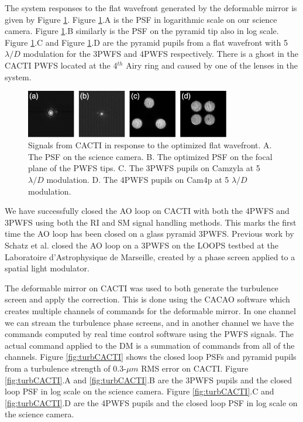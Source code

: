  The system responses to the flat wavefront generated by the deformable mirror is given by Figure \ref{fig:flatCACTI}. Figure \ref{fig:flatCACTI}.A is the PSF in logarithmic scale on our science camera. Figure \ref{fig:flatCACTI}.B similarly is the PSF on the pyramid tip also in log scale. Figure  \ref{fig:flatCACTI}.C and Figure \ref{fig:flatCACTI}.D are the pyramid pupils from a flat wavefront with 5$\lambda/D$ modulation for the 3PWFS and 4PWFS respectively. There is a ghost in the CACTI PWFS located at the 4$^{th}$ Airy ring and caused by one of the lenses in the system. 

\begin{figure}
    \centering
    \includegraphics[width=0.8\textwidth]{Chapter Materials/Chapter Five Materials/flatCACTI.png}
    \caption{Signals from CACTI in response to the optimized flat wavefront. A. The PSF on the science camera. B. The optimized PSF on the focal plane of the PWFS tips. C. The 3PWFS pupils on Camzyla at 5 $\lambda/D$ modulation. D. The 4PWFS pupils on Cam4p at 5 $\lambda/D$ modulation.}
    \label{fig:flatCACTI}
\end{figure}


We have successfully closed the AO loop on CACTI with both the 4PWFS and 3PWFS using both the RI and SM signal handling methods. This marks the first time the AO loop has been closed on a glass pyramid 3PWFS. Previous work by Schatz et al. closed the AO loop on a 3PWFS on the LOOPS testbed at the Laboratoire d'Astrophysique de Marseille, created by a phase screen applied to a spatial light modulator. 


The deformable mirror on CACTI was used to both generate the turbulence screen and apply the correction. This is done using the CACAO software which creates multiple channels of commands for the deformable mirror. In one channel we can stream the turbulence phase screens, and in another channel we have the commands computed by real time control software using the PWFS signals. The actual command applied to the DM is a summation of commands from all of the channels. Figure \ref{fig:turbCACTI} shows the closed loop PSFs and pyramid pupils from a turbulence strength of 0.3-$\mu m$ RMS error on CACTI. Figure \ref{fig:turbCACTI}.A and \ref{fig:turbCACTI}.B are the 3PWFS pupils and the closed loop PSF in log scale on the science camera. Figure \ref{fig:turbCACTI}.C and \ref{fig:turbCACTI}.D are the 4PWFS pupils and the closed loop PSF in log scale on the science camera.

